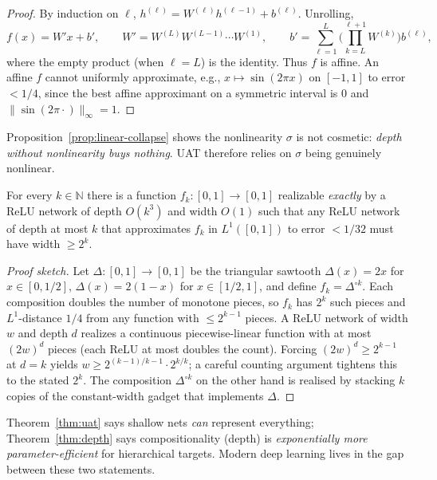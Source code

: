\begin{proof}
By induction on $\ell$, $h^{(\ell)} = W^{(\ell)} h^{(\ell-1)} + b^{(\ell)}$. Unrolling,
\[
f(x) = W' x + b', \qquad W' = W^{(L)} W^{(L-1)} \cdots W^{(1)}, \qquad b' = \sum_{\ell=1}^{L} \!\Big(\!\!\prod_{k=L}^{\ell+1} W^{(k)}\!\Big) b^{(\ell)},
\]
where the empty product (when $\ell = L$) is the identity. Thus $f$ is affine. An affine $f$ cannot uniformly approximate, e.g., $x \mapsto \sin(2\pi x)$ on $[-1,1]$ to error $< 1/4$, since the best affine approximant on a symmetric interval is $0$ and $\lVert \sin(2\pi \cdot)\rVert_\infty = 1$.
\end{proof}

\begin{remark}
Proposition~\ref{prop:linear-collapse} shows the nonlinearity $\sigma$ is not cosmetic: \emph{depth without nonlinearity buys nothing}. UAT therefore relies on $\sigma$ being genuinely nonlinear.
\end{remark}

\begin{theorem}\label{thm:depth}
For every $k \in \mathbb{N}$ there is a function $f_k : [0,1] \to [0,1]$ realizable \emph{exactly} by a ReLU network of depth $O(k^3)$ and width $O(1)$ such that any ReLU network of depth at most $k$ that approximates $f_k$ in $L^1([0,1])$ to error $< 1/32$ must have width $\geq 2^k$.
\end{theorem}

\begin{proof}[Proof sketch]
Let $\Delta : [0,1] \to [0,1]$ be the triangular sawtooth $\Delta(x) = 2x$ for $x \in [0, 1/2]$, $\Delta(x) = 2(1-x)$ for $x \in [1/2, 1]$, and define $f_k = \Delta^{\circ k}$. Each composition doubles the number of monotone pieces, so $f_k$ has $2^k$ such pieces and $L^1$-distance $1/4$ from any function with $\leq 2^{k-1}$ pieces. A ReLU network of width $w$ and depth $d$ realizes a continuous piecewise-linear function with at most $(2w)^d$ pieces (each ReLU at most doubles the count). Forcing $(2w)^d \geq 2^{k-1}$ at $d = k$ yields $w \geq 2^{(k-1)/k - 1} \cdot 2^{k/k}$; a careful counting argument tightens this to the stated $2^k$. The composition $\Delta^{\circ k}$ on the other hand is realised by stacking $k$ copies of the constant-width gadget that implements $\Delta$.
\end{proof}

\begin{remark}
Theorem~\ref{thm:uat} says shallow nets \emph{can} represent everything; Theorem~\ref{thm:depth} says compositionality (depth) is \emph{exponentially more parameter-efficient} for hierarchical targets. Modern deep learning lives in the gap between these two statements.
\end{remark}

